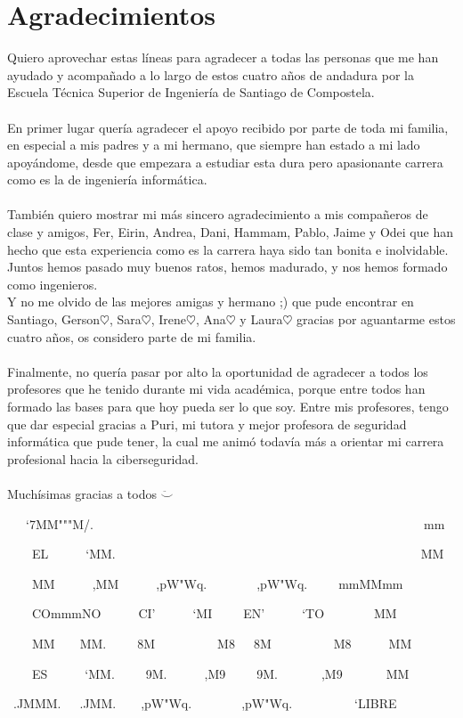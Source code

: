 \pagestyle{plain}
\chapter*{Agradecimientos}
Quiero aprovechar estas líneas para agradecer a todas las personas que me han ayudado y acompañado a lo largo de estos cuatro años de andadura por la Escuela Técnica Superior de Ingeniería de Santiago de Compostela.
\\\\En primer lugar quería agradecer el apoyo recibido por parte de toda mi familia, en especial a mis padres y a mi hermano, que siempre han estado a mi lado apoyándome, desde que empezara a estudiar esta dura pero apasionante carrera como es la de ingeniería informática.
\\\\También quiero mostrar mi más sincero agradecimiento a mis compañeros de clase y amigos, Fer, Eirin, Andrea, Dani, Hammam, Pablo, Jaime y Odei que han hecho que esta experiencia como es la carrera haya sido tan bonita e inolvidable. Juntos hemos pasado muy buenos ratos, hemos madurado, y nos hemos formado como ingenieros.
\\Y no me olvido de las mejores amigas y hermano ;) que pude encontrar en Santiago, Gerson$\heartsuit$, Sara$\heartsuit$, Irene$\heartsuit$, Ana$\heartsuit$ y Laura$\heartsuit$ gracias por aguantarme estos cuatro años, os considero parte de mi familia.
\\\\Finalmente, no quería pasar por alto la oportunidad de agradecer a todos los profesores que he tenido durante mi vida académica, porque entre todos han formado las bases para que hoy pueda ser lo que soy. Entre mis profesores, tengo que dar especial gracias a Puri, mi tutora y mejor profesora de seguridad informática que pude tener, la cual me animó todavía más a orientar mi carrera profesional hacia la ciberseguridad.
\\\\Muchísimas gracias a todos $\ddot\smile$

~~~`7MM"""M/.~~~~~~~~~~~~~~~~~~~~~~~~~~~~~~~~~~~~~~~~~~~~~~~~~~~~~mm    

~~~~EL~~~~~~`MM.~~~~~~~~~~~~~~~~~~~~~~~~~~~~~~~~~~~~~~~~~~~~~~~~~MM    

~~~~MM~~~~~~,MM~~~~~~,pW"Wq.~~~~~~~~,pW"Wq.~~~~~mmMMmm  

~~~~COmmmNO~~~~~~CI'~~~~~~`MI~~~~~EN'~~~~~~`TO~~~~~~~~MM    

~~~~MM~~~~MM.~~~~~8M~~~~~~~~~~M8~~~8M~~~~~~~~~~M8~~~~~~MM    

~~~~ES~~~~~~`MM.~~~~~9M.~~~~~~,M9~~~~~9M.~~~~~~~,M9~~~~~~~MM    

~.JMMM.~~~.JMM.~~~~,pW"Wq.~~~~~~~~,pW"Wq.~~~~~~~~~~`LIBRE 




